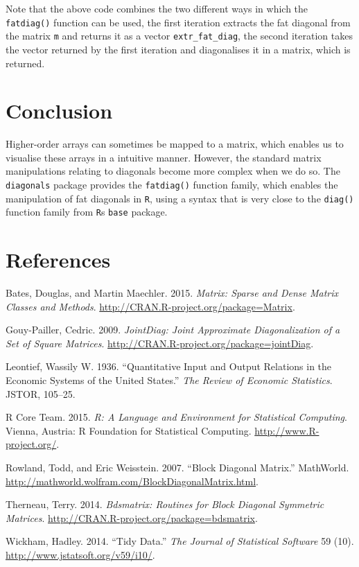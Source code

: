 \documentclass[article]{jss}
\begin{document}
Note that the above code combines the two different ways in which the
\texttt{fatdiag()} function can be used, the first iteration extracts
the fat diagonal from the matrix \texttt{m} and returns it as a vector
\texttt{extr\_fat\_diag}, the second iteration takes the vector returned
by the first iteration and diagonalises it in a matrix, which is
returned.

\section{Conclusion}\label{conclusion}

Higher-order arrays can sometimes be mapped to a matrix, which enables
us to visualise these arrays in a intuitive manner. However, the
standard matrix manipulations relating to diagonals become more complex
when we do so. The \texttt{diagonals} package provides the
\texttt{fatdiag()} function family, which enables the manipulation of
fat diagonals in \texttt{R}, using a syntax that is very close to the
\texttt{diag()} function family from \texttt{R}s \texttt{base} package.

\section*{References}\label{references}

Bates, Douglas, and Martin Maechler. 2015. \emph{Matrix: Sparse and
Dense Matrix Classes and Methods}.
\url{http://CRAN.R-project.org/package=Matrix}.

Gouy-Pailler, Cedric. 2009. \emph{JointDiag: Joint Approximate
Diagonalization of a Set of Square Matrices}.
\url{http://CRAN.R-project.org/package=jointDiag}.

Leontief, Wassily W. 1936. ``Quantitative Input and Output Relations in
the Economic Systems of the United States.'' \emph{The Review of
Economic Statistics}. JSTOR, 105--25.

R Core Team. 2015. \emph{R: A Language and Environment for Statistical
Computing}. Vienna, Austria: R Foundation for Statistical Computing.
\url{http://www.R-project.org/}.

Rowland, Todd, and Eric Weisstein. 2007. ``Block Diagonal Matrix.''
MathWorld. \url{http://mathworld.wolfram.com/BlockDiagonalMatrix.html}.

Therneau, Terry. 2014. \emph{Bdsmatrix: Routines for Block Diagonal
Symmetric Matrices}. \url{http://CRAN.R-project.org/package=bdsmatrix}.

Wickham, Hadley. 2014. ``Tidy Data.'' \emph{The Journal of Statistical
Software} 59 (10). \url{http://www.jstatsoft.org/v59/i10/}.
\end{document}
